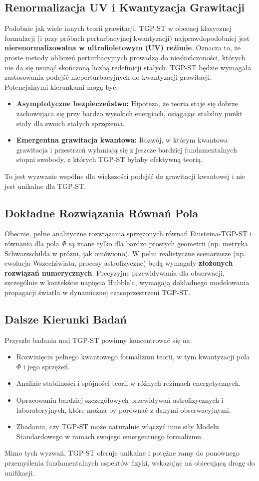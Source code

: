 \documentclass[11pt,a4paper]{article}
\begin{document}
\subsection{Renormalizacja UV i Kwantyzacja Grawitacji}
Podobnie jak wiele innych teorii grawitacji, TGP-ST w obecnej klasycznej formulacji (i przy próbach perturbacyjnej kwantyzacji) najprawdopodobniej jest \textbf{nierenormalizowalna w ultrafioletowym (UV) reżimie}. Oznacza to, że proste metody obliczeń perturbacyjnych prowadzą do nieskończoności, których nie da się usunąć skończoną liczbą redefinicji stałych.
TGP-ST będzie wymagała zastosowania podejść nieperturbacyjnych do kwantyzacji grawitacji. Potencjalnymi kierunkami mogą być:
\begin{itemize}
    \item \textbf{Asymptotyczne bezpieczeństwo:} Hipoteza, że teoria staje się dobrze zachowująca się przy bardzo wysokich energiach, osiągając stabilny punkt stały dla swoich stałych sprzężenia.
    \item \textbf{Emergentna grawitacja kwantowa:} Rozwój, w którym kwantowa grawitacja i przestrzeń wyłaniają się z jeszcze bardziej fundamentalnych stopni swobody, z których TGP-ST byłaby efektywną teorią.
\end{itemize}
To jest wyzwanie wspólne dla większości podejść do grawitacji kwantowej i nie jest unikalne dla TGP-ST.

\subsection{Dokładne Rozwiązania Równań Pola}
Obecnie, pełne analityczne rozwiązania sprzężonych równań Einsteina-TGP-ST i równania dla pola $\Phi$ są znane tylko dla bardzo prostych geometrii (np. metryka Schwarzschilda w próżni, jak omówiono). W pełni realistyczne scenariusze (np. ewolucja Wszechświata, procesy astrofizyczne) będą wymagały \textbf{złożonych rozwiązań numerycznych}. Precyzyjne przewidywania dla obserwacji, szczególnie w kontekście napięcia Hubble'a, wymagają dokładnego modelowania propagacji światła w dynamicznej czasoprzestrzeni TGP-ST.

\subsection{Dalsze Kierunki Badań}
Przyszłe badania nad TGP-ST powinny koncentrować się na:
\begin{itemize}
    \item Rozwinięciu pełnego kwantowego formalizmu teorii, w tym kwantyzacji pola $\Phi$ i jego sprzężeń.
    \item Analizie stabilności i spójności teorii w różnych reżimach energetycznych.
    \item Opracowaniu bardziej szczegółowych przewidywań astrofizycznych i laboratoryjnych, które można by porównać z danymi obserwacyjnymi.
    \item Zbadaniu, czy TGP-ST może naturalnie włączyć inne siły Modelu Standardowego w ramach swojego emergentnego formalizmu.
\end{itemize}
Mimo tych wyzwań, TGP-ST oferuje unikalne i potężne ramy do ponownego przemyślenia fundamentalnych aspektów fizyki, wskazując na obiecującą drogę do unifikacji.
\end{document}
